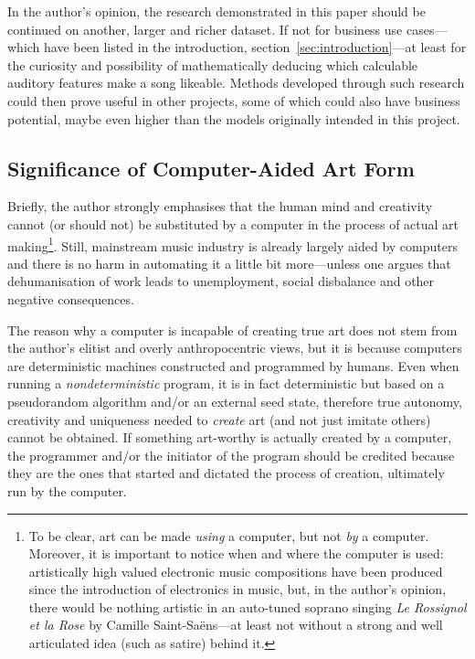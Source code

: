 \documentclass[conference, a4paper, 12pt]{IEEEtran}
\begin{document}
    \par

    In the author's opinion, the research demonstrated in this paper should be continued on another, larger and richer dataset. If not for business use cases---which have been listed in the introduction, section~\ref{sec:introduction}---at least for the curiosity and possibility of mathematically deducing which calculable auditory features make a song likeable. Methods developed through such research could then prove useful in other projects, some of which could also have business potential, maybe even higher than the models originally intended in this project.

    \par

    \subsection{Significance of Computer-Aided Art Form}
    \label{subsec:significance_of_computer_aided_art_form}

    Briefly, the author strongly emphasises that the human mind and creativity cannot (or should not) be substituted by a computer in the process of actual art making\footnote{To be clear, art can be made \emph{using} a computer, but not \emph{by} a computer. Moreover, it is important to notice when and where the computer is used: artistically high valued electronic music compositions have been produced since the introduction of electronics in music, but, in the author's opinion, there would be nothing artistic in an auto-tuned soprano singing \foreignlanguage{french}{\emph{Le Rossignol et la Rose}} by \foreignlanguage{french}{Camille Saint-Sa\"{e}ns}---at least not without a strong and well articulated idea (such as satire) behind it.}. Still, mainstream music industry is already largely aided by computers and there is no harm in automating it a little bit more---unless one argues that dehumanisation of work leads to unemployment, social disbalance and other negative consequences.

    \par

    The reason why a computer is incapable of creating true art does not stem from the author's elitist and overly anthropocentric views, but it is because computers are deterministic machines constructed and programmed by humans. Even when running a \emph{nondeterministic} program, it is in fact deterministic but based on a pseudorandom algorithm and/or an external seed state, therefore true autonomy, creativity and uniqueness needed to \emph{create} art (and not just imitate others) cannot be obtained. If something art-worthy is actually created by a computer, the programmer and/or the initiator of the program should be credited because they are the ones that started and dictated the process of creation, ultimately run by the computer.
\end{document}

